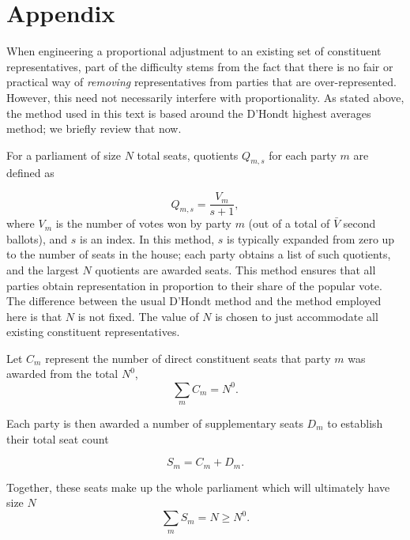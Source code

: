 \documentclass[DIV=calc, paper=a4, fontsize=11pt, twocolumn]{scrartcl}	 %
\begin{document}
\clearpage
\section{Appendix}

When engineering a proportional adjustment to an existing set of constituent representatives, part of the difficulty stems from the fact that there is no fair or practical way of \emph{removing} representatives from parties that are over-represented. 
However, this need not necessarily interfere with proportionality. As stated above, the method used in this text is based around the D'Hondt highest averages method; we briefly review that now. 

For a parliament of size $N$ total seats, quotients $Q_{m,s}$ for each party $m$ are defined as 

\begin{equation}
\label{eq:Dhondt}
Q_{m,s} = \frac{V_m}{s +1},
\end{equation}
where $V_m$ is the number of votes won by party $m$  (out of a total of $\bar{V}$ second ballots), and $s$ is an index. In this method, $s$ is typically expanded from zero up to the number of seats in the house; each party obtains a list of such quotients, and the largest $N$ quotients are awarded seats. This method ensures that all parties obtain representation in proportion to their share of the popular vote. 
The difference between the usual D'Hondt method and the method employed here is that $N$ is not fixed. The value of $N$ is chosen to just accommodate all existing constituent representatives.

Let $C_m$ represent the number of direct constituent seats that party $m$ was awarded from the total $N^0$,
\begin{equation}
\label{eq:sum_Cm}
\sum_m C_m = N^0.
\end{equation}

Each party is then awarded a number of supplementary seats $D_m$ to establish their total seat count 

\begin{equation}
\label{eq:seat_total}
S_m=C_m+D_m.
\end{equation}

Together, these seats make up the whole parliament which will ultimately have size $N$
\begin{equation}
\label{eq:sum_Sm}
\sum_m S_m = N \ge N^0.
\end{equation}
\end{document}

